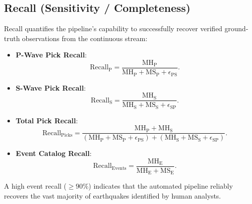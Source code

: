 \subsection{Recall (Sensitivity / Completeness)}
Recall quantifies the pipeline's capability to successfully recover verified ground-truth observations from the continuous stream:
\begin{itemize}
  \item \textbf{P-Wave Pick Recall}:
  \begin{equation}
    \mathrm{Recall}_{\mathrm{P}} = \frac{\mathrm{MH}_{\mathrm{P}}}{\mathrm{MH}_{\mathrm{P}} + \mathrm{MS}_{\mathrm{P}} + \epsilon_{\mathrm{PS}}}.
  \end{equation}
  \item \textbf{S-Wave Pick Recall}:
  \begin{equation}
    \mathrm{Recall}_{\mathrm{S}} = \frac{\mathrm{MH}_{\mathrm{S}}}{\mathrm{MH}_{\mathrm{S}} + \mathrm{MS}_{\mathrm{S}} + \epsilon_{\mathrm{SP}}}.
  \end{equation}
  \item \textbf{Total Pick Recall}:
  \begin{equation}
    \mathrm{Recall}_{\mathrm{Picks}} = \frac{\mathrm{MH}_{\mathrm{P}} + \mathrm{MH}_{\mathrm{S}}}{\left(\mathrm{MH}_{\mathrm{P}} + \mathrm{MS}_{\mathrm{P}} + \epsilon_{\mathrm{PS}}\right) + \left(\mathrm{MH}_{\mathrm{S}} + \mathrm{MS}_{\mathrm{S}} + \epsilon_{\mathrm{SP}}\right)}.
  \end{equation}
  \item \textbf{Event Catalog Recall}:
  \begin{equation}
    \mathrm{Recall}_{\mathrm{Events}} = \frac{\mathrm{MH}_{\mathrm{E}}}{\mathrm{MH}_{\mathrm{E}} + \mathrm{MS}_{\mathrm{E}}}.
  \end{equation}
\end{itemize}

A high event recall ($\ge 90\%$) indicates that the automated pipeline reliably recovers the vast majority of earthquakes identified by human analysts.

